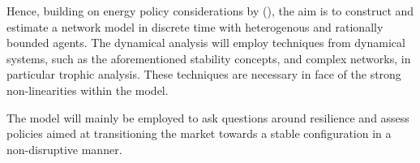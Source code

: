 \documentclass[american]{scrartcl}
\begin{document}
Hence, building on energy policy considerations by \citeauthor{Parag2016} (\citeyear{Parag2016}), the aim is to construct and estimate a network model in discrete time with heterogenous and rationally bounded agents. The dynamical analysis will employ techniques from dynamical systems, such as the aforementioned stability concepts, and complex networks, in particular trophic analysis. These techniques are necessary in face of the strong non-linearities within the model.

The model will mainly be employed to ask questions around resilience and assess policies aimed at transitioning the market towards a stable configuration in a non-disruptive manner.

\newpage
{} %
\printbibliography
\end{document}
